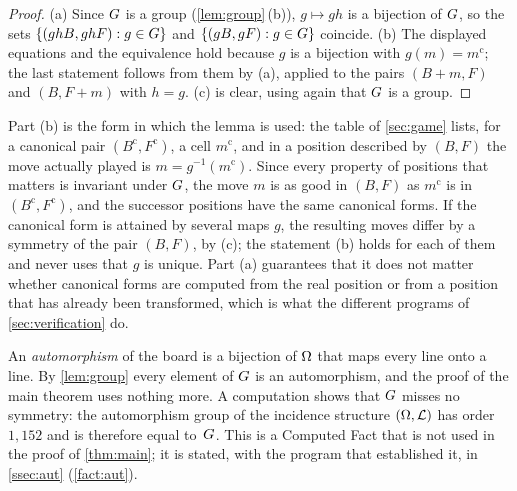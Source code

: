 \begin{proof}
(a) Since $G$ is a group (\cref{lem:group}\,(b)), $g\mapsto gh$ is a bijection of $G$, so the sets
$\{(ghB,ghF):g\in G\}$ and $\{(gB,gF):g\in G\}$ coincide. (b) The displayed equations and the equivalence
hold because $g$ is a bijection with $g(m)=m^{\mathrm c}$; the last statement follows from them by (a),
applied to the pairs $(B+m,F)$ and $(B,F+m)$ with $h=g$. (c) is clear, using again that $G$ is a group.
\end{proof}

Part (b) is the form in which the lemma is used: the table of \cref{sec:game} lists, for a canonical
pair $(B^{\mathrm c},F^{\mathrm c})$, a cell $m^{\mathrm c}$, and in a position described by $(B,F)$ the
move actually played is $m=g^{-1}(m^{\mathrm c})$. Since every property of positions that matters is
invariant under $G$, the move $m$ is as good in $(B,F)$ as $m^{\mathrm c}$ is in
$(B^{\mathrm c},F^{\mathrm c})$, and the successor positions have the same canonical forms. If the
canonical form is attained by several maps $g$, the resulting moves differ by a symmetry of the pair
$(B,F)$, by (c); the statement (b) holds for each of them and never uses that $g$ is unique. Part (a)
guarantees that it does not matter whether canonical forms are computed from the real position or from a
position that has already been transformed, which is what the different programs of
\cref{sec:verification} do.

\begin{remark}\label{rem:aut}
An \emph{automorphism} of the board is a bijection of $\Omega$ that maps every line onto a line. By
\cref{lem:group} every element of $G$ is an automorphism, and the proof of the main theorem uses nothing
more. A computation shows that $G$ misses no symmetry: the automorphism group of the incidence structure
$(\Omega,\mathcal{L})$ has order $1{,}152$ and is therefore equal to~$G$. This is a Computed Fact that is not used
in the proof of \cref{thm:main}; it is stated, with the program that established it, in \cref{ssec:aut}
(\cref{fact:aut}).
\end{remark}
